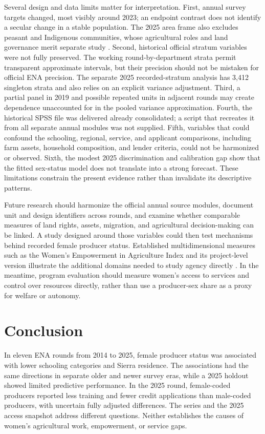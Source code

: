 \documentclass[11pt,a4paper]{article}
\begin{document}
Several design and data limits matter for interpretation. First, annual survey targets changed, most visibly around 2023; an endpoint contrast does not identify a secular change in a stable population. The 2025 area frame also excludes peasant and Indigenous communities, whose agricultural roles and land governance merit separate study \cite{inei2025,sarapura2022}. Second, historical official stratum variables were not fully preserved. The working round-by-department strata permit transparent approximate intervals, but their precision should not be mistaken for official ENA precision. The separate 2025 recorded-stratum analysis has 3,412 singleton strata and also relies on an explicit variance adjustment. Third, a partial panel in 2019 and possible repeated units in adjacent rounds may create dependence unaccounted for in the pooled variance approximation. Fourth, the historical SPSS file was delivered already consolidated; a script that recreates it from all separate annual modules was not supplied. Fifth, variables that could confound the schooling, regional, service, and applicant comparisons, including farm assets, household composition, and lender criteria, could not be harmonized or observed. Sixth, the modest 2025 discrimination and calibration gap show that the fitted sex-status model does not translate into a strong forecast. These limitations constrain the present evidence rather than invalidate its descriptive patterns.

Future research should harmonize the official annual source modules, document unit and design identifiers across rounds, and examine whether comparable measures of land rights, assets, migration, and agricultural decision-making can be linked. A study designed around those variables could then test mechanisms behind recorded female producer status. Established multidimensional measures such as the Women's Empowerment in Agriculture Index and its project-level version illustrate the additional domains needed to study agency directly \cite{alkire2013,malapit2019}. In the meantime, program evaluation should measure women's access to services and control over resources directly, rather than use a producer-sex share as a proxy for welfare or autonomy.

\section{Conclusion}
In eleven ENA rounds from 2014 to 2025, female producer status was associated with lower schooling categories and Sierra residence. The associations had the same directions in separate older and newer survey eras, while a 2025 holdout showed limited predictive performance. In the 2025 round, female-coded producers reported less training and fewer credit applications than male-coded producers, with uncertain fully adjusted differences. The series and the 2025 access snapshot address different questions. Neither establishes the causes of women's agricultural work, empowerment, or service gaps.
\end{document}
